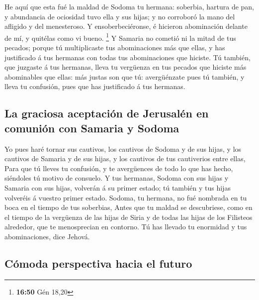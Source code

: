  He aquí que esta fué la maldad de Sodoma tu hermana:
soberbia, hartura de pan, y abundancia de ociosidad tuvo ella y sus
hijas; y no corroboró la mano del afligido y del menesteroso.
 Y ensoberbeciéronse, é hicieron abominación delante de mí,
y quitélas como vi bueno. \footnote{\textbf{16:50} Gén 18,20}
 Y Samaria no cometió ni la mitad de tus pecados; porque tú
multiplicaste tus abominaciones más que ellas, y has justificado á tus
hermanas con todas tus abominaciones que hiciste.  Tú
también, que juzgaste á tus hermanas, lleva tu vergüenza en tus pecados
que hiciste más abominables que ellas: más justas son que tú:
avergüénzate pues tú también, y lleva tu confusión, pues que has
justificado á tus hermanas.

\hypertarget{la-graciosa-aceptaciuxf3n-de-jerusaluxe9n-en-comuniuxf3n-con-samaria-y-sodoma}{%
\subsection{La graciosa aceptación de Jerusalén en comunión con Samaria
y
Sodoma}\label{la-graciosa-aceptaciuxf3n-de-jerusaluxe9n-en-comuniuxf3n-con-samaria-y-sodoma}}

 Yo pues haré tornar sus cautivos, los cautivos de Sodoma y
de sus hijas, y los cautivos de Samaria y de sus hijas, y los cautivos
de tus cautiverios entre ellas,  Para que tú lleves tu
confusión, y te avergüences de todo lo que has hecho, siéndoles tú
motivo de consuelo.  Y tus hermanas, Sodoma con sus hijas y
Samaria con sus hijas, volverán á su primer estado; tú también y tus
hijas volveréis á vuestro primer estado.  Sodoma, tu
hermana, no fué nombrada en tu boca en el tiempo de tus soberbias,
 Antes que tu maldad se descubriese, como en el tiempo de
la vergüenza de las hijas de Siria y de todas las hijas de los Filisteos
alrededor, que te menosprecian en contorno.  Tú has llevado
tu enormidad y tus abominaciones, dice Jehová.

\hypertarget{cuxf3moda-perspectiva-hacia-el-futuro}{%
\subsection{Cómoda perspectiva hacia el
futuro}\label{cuxf3moda-perspectiva-hacia-el-futuro}}

